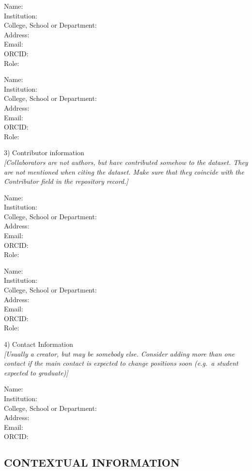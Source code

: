 \documentclass[]{article}
\begin{document}
Name:\\
Institution:\\
College, School or Department:\\
Address:\\
Email:\\
ORCID:\\
Role:

Name:\\
Institution:\\
College, School or Department:\\
Address:\\
Email:\\
ORCID:\\
Role:

3) Contributor information\\
\emph{{[}Collaborators are not authors, but have contributed somehow to
the dataset. They are not mentioned when citing the dataset. Make sure that they coincide with the Contributor field in the repository record.{]}}

Name:\\
Institution:\\
College, School or Department:\\
Address:\\
Email:\\
ORCID:\\
Role:

Name:\\
Institution:\\
College, School or Department:\\
Address:\\
Email:\\
ORCID:\\
Role:

4) Contact Information\\
\emph{{[}Usually a creator, but may be somebody else. Consider adding
more than one contact if the main contact is expected to change
positions soon (e.g.~a student expected to graduate){]}}

Name:\\
Institution:\\
College, School or Department:\\
Address:\\
Email:\\
ORCID:

\subsection{CONTEXTUAL INFORMATION}\label{contextual-information}
\end{document}
